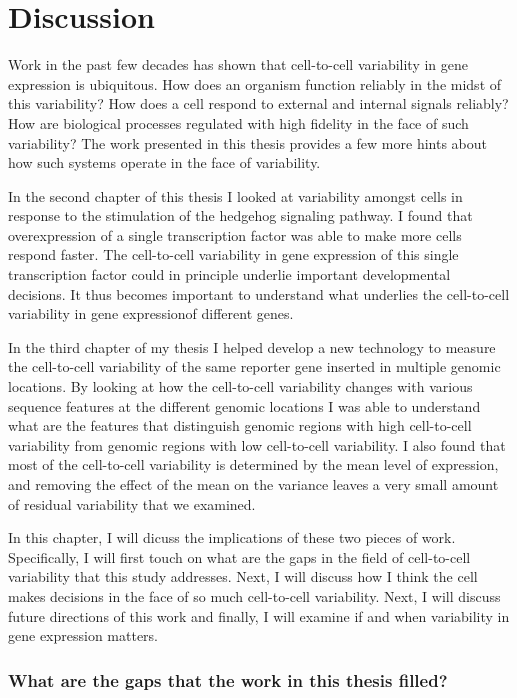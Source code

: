 \chapter{Discussion}
\label{chap:conclusion}
\tightlists

Work in the past few decades has shown that cell-to-cell variability in gene expression is ubiquitous. How does an organism function reliably in the midst of this variability? How does a cell respond to external and internal signals reliably? How are biological processes regulated with high fidelity in the face of such variability? The work presented in this thesis provides a few more hints about how such systems operate in the face of variability.

In the second chapter of this thesis I looked at variability amongst cells in response to the stimulation of the hedgehog signaling pathway. I found that overexpression of a single transcription factor was able to make more cells respond faster. The cell-to-cell variability in gene expression of this single transcription factor could in principle underlie important developmental decisions. It thus becomes important to understand what underlies the cell-to-cell variability in gene expressionof different genes.

In the third chapter of my thesis I helped develop a new technology to measure the cell-to-cell variability of the same reporter gene inserted in multiple genomic locations. By looking at how the cell-to-cell variability changes with various sequence features at the different genomic locations I was able to understand what are the features that distinguish genomic regions with high cell-to-cell variability from genomic regions with low cell-to-cell variability. I also found that most of the cell-to-cell variability is determined by the mean level of expression, and removing the effect of the mean on the variance leaves a very small amount of residual variability that we examined.

In this chapter, I will dicuss the implications of these two pieces of work. Specifically, I will first touch on what are the gaps in the field of cell-to-cell variability that this study addresses. Next, I will discuss how I think the cell makes decisions in the face of so much cell-to-cell variability. Next, I will discuss future directions of this work and finally, I will examine if and when variability in gene expression matters.

\subsection{What are the gaps that the work in this thesis filled?}

